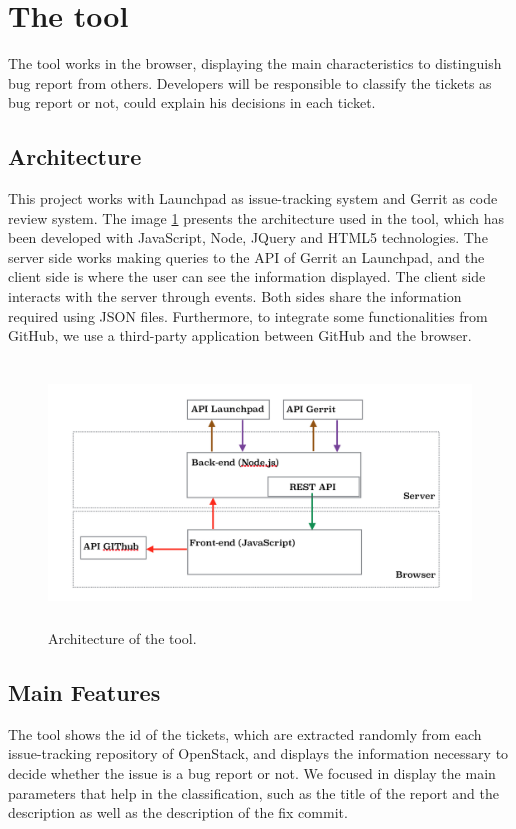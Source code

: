\documentclass[ifip]{svmult}
\begin{document}
\section{The tool}
\label{sec:2}

The tool works in the browser, displaying the main characteristics to distinguish bug report from others. Developers will be responsible to classify the tickets as bug report or not, could explain his decisions in each ticket.


\subsection{Architecture}

This project works with Launchpad as issue-tracking system and Gerrit as code review system. The image \ref{fig:1} presents the architecture used in the tool, which has been developed with JavaScript, Node, JQuery and HTML5 technologies. The server side works making queries to the API of Gerrit an Launchpad, and the client side is where the user can see the information displayed. The client side interacts with the server through events. Both sides share the information required using JSON files. Furthermore, to integrate some functionalities from GitHub, we use a third-party application between GitHub and the browser.

\label{sec:2.1}
\begin{figure}
\centering
\includegraphics[height=7cm]{Arquitectura.png}
\caption{Architecture of the tool.}
\label{fig:1}       %
\end{figure}

\subsection{Main Features}
\label{sec:2.2}
The tool shows the id of the tickets, which are extracted randomly from each issue-tracking repository of OpenStack, and displays the information necessary to decide whether the issue is a bug report or not. We focused in display the main parameters that help in the classification, such as the title of the report and the description as well as the description of the fix commit.
\end{document}
